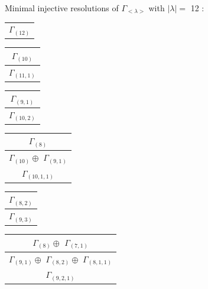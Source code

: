 \documentclass[main.tex]{subfiles}
\begin{document}
\bigskip
Minimal injective resolutions of $\Gamma_{<\lambda>}$ with $|\lambda| = $ 12 : \\
\begin{minipage}{.2\textwidth}
\centering
\begin{tabular}{c}
$\Gamma_{(
12
)}$
\\
\end{tabular}\end{minipage}
\begin{minipage}{.2\textwidth}
\centering
\begin{tabular}{c}
$\Gamma_{(
10
)}$
\\ \hline
$\Gamma_{(
11 , 
1
)}$
\\
\end{tabular}\end{minipage}
\begin{minipage}{.2\textwidth}
\centering
\begin{tabular}{c}
$\Gamma_{(
9 , 
1
)}$
\\ \hline
$\Gamma_{(
10 , 
2
)}$
\\
\end{tabular}\end{minipage}
\begin{minipage}{.2\textwidth}
\centering
\begin{tabular}{c}
$\Gamma_{(
8
)}$
\\ \hline
$\Gamma_{(
10
)} \oplus$
$\Gamma_{(
9 , 
1
)}$
\\ \hline
$\Gamma_{(
10 , 
1 , 
1
)}$
\\
\end{tabular}\end{minipage}
\begin{minipage}{.2\textwidth}
\centering
\begin{tabular}{c}
$\Gamma_{(
8 , 
2
)}$
\\ \hline
$\Gamma_{(
9 , 
3
)}$
\\
\end{tabular}\end{minipage}
\bigskip
\begin{minipage}{.3\textwidth}
\centering
\begin{tabular}{c}
$\Gamma_{(
8
)} \oplus$
$\Gamma_{(
7 , 
1
)}$
\\ \hline
$\Gamma_{(
9 , 
1
)} \oplus$
$\Gamma_{(
8 , 
2
)} \oplus$
$\Gamma_{(
8 , 
1 , 
1
)}$
\\ \hline
$\Gamma_{(
9 , 
2 , 
1
)}$
\\
\end{tabular}\end{minipage}
\end{document}
